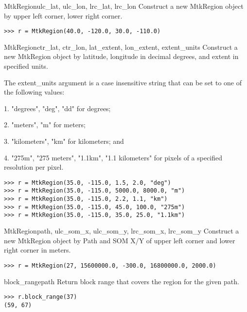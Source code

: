 \documentclass{howto}
\begin{document}
\begin{classdesc}{MtkRegion}{ulc_lat, ulc_lon, lrc_lat, lrc_lon}
  Construct a new MtkRegion object by upper left corner, lower right corner.

\begin{verbatim}
>>> r = MtkRegion(40.0, -120.0, 30.0, -110.0)
\end{verbatim}
\end{classdesc}

\begin{classdesc}{MtkRegion}{ctr_lat, ctr_lon, lat_extent, lon_extent, extent_units}
  Construct a new MtkRegion object by latitude, longitude in decimal degrees, and extent in specified units.

  The extent_units argument is a case insensitive string that can be set to one of the following values:

   1. "degrees", "deg", "dd" for degrees;

   2. "meters", "m" for meters;

   3. "kilometers", "km" for kilometers; and

   4. "275m", "275 meters", "1.1km", "1.1 kilometers" for pixels of a specified resolution per pixel.

\begin{verbatim}
>>> r = MtkRegion(35.0, -115.0, 1.5, 2.0, "deg")
>>> r = MtkRegion(35.0, -115.0, 5000.0, 8000.0, "m")
>>> r = MtkRegion(35.0, -115.0, 2.2, 1.1, "km")
>>> r = MtkRegion(35.0, -115.0, 45.0, 100.0, "275m")
>>> r = MtkRegion(35.0, -115.0, 35.0, 25.0, "1.1km")
\end{verbatim}
\end{classdesc}

\begin{classdesc}{MtkRegion}{path, ulc_som_x, ulc_som_y, lrc_som_x, lrc_som_y}
  Construct a new MtkRegion object by Path and SOM X/Y of upper left corner and lower right corner in meters. 

\begin{verbatim}
>>> r = MtkRegion(27, 15600000.0, -300.0, 16800000.0, 2000.0)
\end{verbatim}
\end{classdesc}

\begin{methoddesc}{block_range}{path}
  Return block range that covers the region for the given path.

\begin{verbatim}
>>> r.block_range(37)
(59, 67)
\end{verbatim}
\end{methoddesc}
\end{document}
